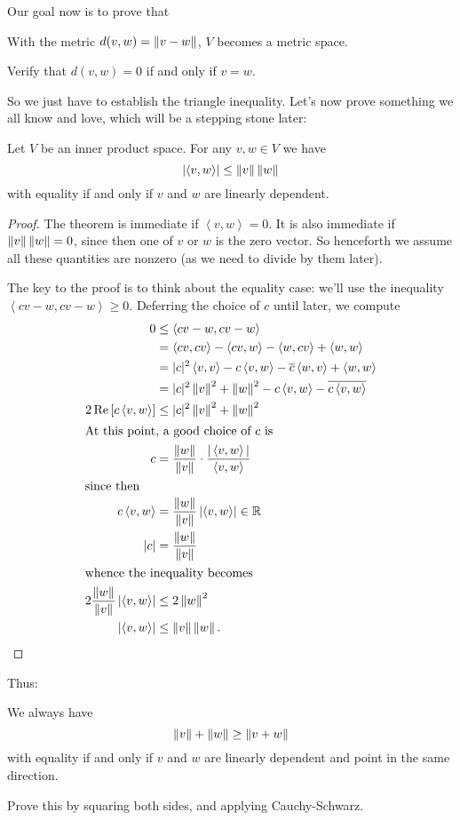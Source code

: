 Our goal now is to prove that
\begin{moral}
	With the metric $d(v,w) = \left\lVert v-w \right\rVert$, $V$ becomes a metric space.
\end{moral}
\begin{ques}
	Verify that $d(v,w) = 0$ if and only if $v = w$.
\end{ques}
So we just have to establish the triangle inequality.
Let's now prove something we all know and love,
which will be a stepping stone later:
\begin{lemma}
	Let $V$ be an inner product space.
	For any $v,w \in V$ we have
	\[ \left\lvert \left< v,w\right> \right\rvert
	\le \left\lVert v \right\rVert \left\lVert w \right\rVert \]
	with equality if and only if $v$ and $w$ are linearly dependent.
\end{lemma}
\begin{proof}
	The theorem is immediate if $\left< v,w\right> = 0$.
	It is also immediate if $\left\lVert v \right\rVert \left\lVert w \right\rVert = 0$,
	since then one of $v$ or $w$ is the zero vector.
	So henceforth we assume all these quantities are nonzero
	(as we need to divide by them later).

	The key to the proof is to think about the equality case:
	we'll use the inequality $\left< cv-w, cv-w\right> \ge 0$.
	Deferring the choice of $c$ until later, we compute
	\begin{align*}
		0 &\le \left< cv-w, cv-w \right> \\
		&= \left< cv, cv\right> - \left< cv, w\right> - \left< w, cv\right> + \left< w,w \right> \\
		&= |c|^2 \left< v,v \right> - c \left< v,w \right> - \overline c \left< w,v \right> + \left< w,w \right> \\
		&= |c|^2 \left\lVert v \right\rVert^2 + \left\lVert w \right\rVert^2 - c \left< v,w \right> - \overline{c \left< v,w\right> } \\
		2 \operatorname{Re} \left[ c \left< v,w \right> \right] &\le |c|^2 \left\lVert v \right\rVert^2 + \left\lVert w \right\rVert^2  \\
		\intertext{At this point, a good choice of $c$ is}
		c &= \frac{ \left\lVert w \right\rVert}{\left\lVert v \right\rVert} \cdot \frac{|\left< v,w\right>|}{\left< v,w\right>} \\
		\intertext{since then}
		c \left< v,w \right> &= \frac{\left\lVert w \right\rVert}{\left\lVert v \right\rVert} \left\lvert \left< v,w\right> \right\rvert \in \mathbb R \\
		|c| &= \frac{\left\lVert w \right\rVert}{\left\lVert v \right\rVert} \\
		\intertext{whence the inequality becomes}
		 2\frac{\left\lVert w \right\rVert}{\left\lVert v \right\rVert} \left\lvert \left< v,w\right> \right\rvert &\le 2 \left\lVert w \right\rVert^2  \\
		 \left\lvert \left< v,w\right> \right\rvert &\le \left\lVert v \right\rVert \left\lVert w \right\rVert. \qedhere
	\end{align*}
\end{proof}
Thus:
\begin{theorem}
	We always have
	\[ \left\lVert v \right\rVert + \left\lVert w \right\rVert \ge \left\lVert v+w \right\rVert \]
	with equality if and only if $v$ and $w$ are linearly dependent
	and point in the same direction.
\end{theorem}
\begin{exercise}
	Prove this by squaring both sides, and applying Cauchy-Schwarz.
\end{exercise}

